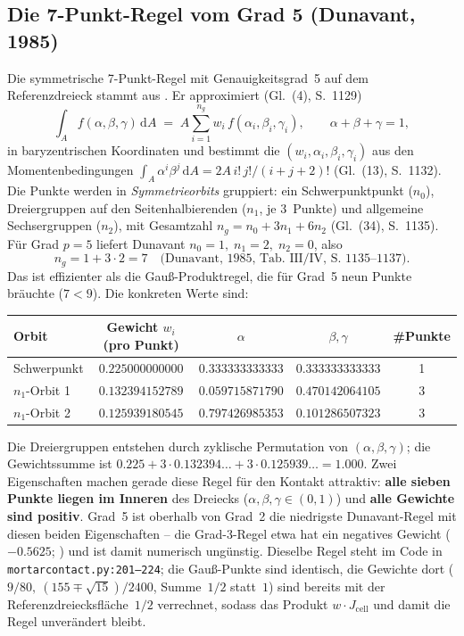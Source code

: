 \documentclass[a4paper,11pt]{article}
\def\tfrac#1#2{#1/#2}%
\newcommand{\file}[1]{\texttt{\small #1}}
\begin{document}
\subsection{Die 7-Punkt-Regel vom Grad 5 (Dunavant, 1985)}
Die symmetrische 7-Punkt-Regel mit Genauigkeitsgrad~5 auf dem Referenzdreieck stammt aus
\citet{dunavant1985}. Er approximiert (Gl.~(4), S.~1129)
\begin{equation}
\int_A f(\alpha,\beta,\gamma)\,\mathrm dA \;=\; A\sum_{i=1}^{n_g} w_i\, f(\alpha_i,\beta_i,\gamma_i),
\qquad \alpha+\beta+\gamma=1,
\end{equation}
in baryzentrischen Koordinaten und bestimmt die $(w_i,\alpha_i,\beta_i,\gamma_i)$ aus den
Momentenbedingungen $\int_A \alpha^i\beta^j\,\mathrm dA = 2A\,i!\,j!/(i+j+2)!$ (Gl.~(13), S.~1132).
Die Punkte werden in \emph{Symmetrieorbits} gruppiert: ein Schwerpunktpunkt ($n_0$), Dreiergruppen
auf den Seitenhalbierenden ($n_1$, je 3~Punkte) und allgemeine Sechsergruppen ($n_2$), mit
Gesamtzahl $n_g = n_0 + 3n_1 + 6n_2$ (Gl.~(34), S.~1135). Für Grad $p=5$ liefert Dunavant
$n_0=1,\;n_1=2,\;n_2=0$, also
\begin{equation}
n_g = 1 + 3\cdot 2 = 7 \quad\text{(Dunavant, 1985, Tab.~III/IV, S.~1135--1137)}.
\end{equation}
Das ist effizienter als die Gauß-Produktregel, die für Grad~5 neun Punkte bräuchte
($7<9$). Die konkreten Werte \citep[Anh.~II, S.~1140]{dunavant1985} sind:
\begin{center}
\small
\begin{tabular}{lcccc}
\toprule
Orbit & Gewicht $w_i$ (pro Punkt) & $\alpha$ & $\beta,\gamma$ & \#Punkte \\
\midrule
Schwerpunkt & $0.225000000000$ & $0.333333333333$ & $0.333333333333$ & 1 \\
$n_1$-Orbit 1 & $0.132394152789$ & $0.059715871790$ & $0.470142064105$ & 3 \\
$n_1$-Orbit 2 & $0.125939180545$ & $0.797426985353$ & $0.101286507323$ & 3 \\
\bottomrule
\end{tabular}
\end{center}
Die Dreiergruppen entstehen durch zyklische Permutation von $(\alpha,\beta,\gamma)$; die
Gewichtssumme ist $0.225 + 3\cdot0.132394\ldots + 3\cdot0.125939\ldots = 1.000$. Zwei Eigenschaften
machen gerade diese Regel für den Kontakt attraktiv: \textbf{alle sieben Punkte liegen im Inneren}
des Dreiecks ($\alpha,\beta,\gamma\in(0,1)$) und \textbf{alle Gewichte sind positiv}. Grad~5 ist
oberhalb von Grad~2 die niedrigste Dunavant-Regel mit diesen beiden Eigenschaften -- die Grad-3-Regel
etwa hat ein negatives Gewicht ($-0.5625$; \citealp[S.~1140]{dunavant1985}) und ist damit numerisch
ungünstig. Dieselbe Regel steht im Code in \file{mortarcontact.py:\allowbreak{}201--224}; die
Gauß-Punkte sind identisch, die Gewichte dort ($9/80,\ (155\mp\sqrt{15})/2400$, Summe~$\tfrac12$
statt~$1$) sind bereits mit der Referenzdreiecksfläche~$\tfrac12$ verrechnet, sodass das Produkt
$w\cdot J_{\text{cell}}$ und damit die Regel unverändert bleibt.
\end{document}

